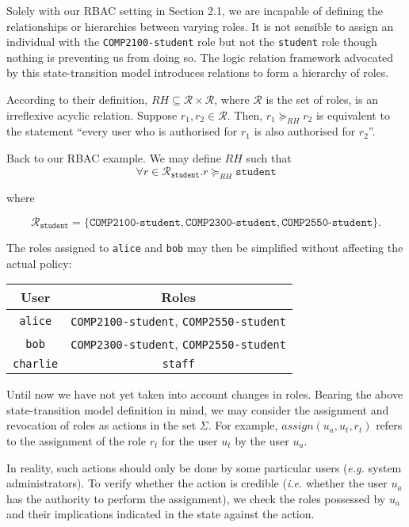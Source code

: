 \documentclass{article}
\begin{document}
Solely with our RBAC setting in Section 2.1, we are incapable of defining the relationships or hierarchies between varying roles. It is not sensible to assign an individual with the \texttt{COMP2100-student} role but not the \texttt{student} role though nothing is preventing us from doing so. The logic relation framework advocated by this state-transition model introduces relations to form a hierarchy of roles.

According to their definition, $RH \subseteq \mathcal{R} \times \mathcal{R}$, where $\mathcal{R}$ is the set of roles, is an irreflexive acyclic relation.\cite{formal-verification} Suppose $r_{1}, r_{2} \in \mathcal{R}$. Then, $r_{1} \succeq_{RH} r_{2}$ is equivalent to the statement ``every user who is authorised for $r_{1}$ is also authorised for $r_{2}$''.

Back to our RBAC example. We may define $RH$ such that
$$\forall r \in \mathcal{R}_{\texttt{student}} . r \succeq_{RH} \texttt{student}$$
\begin{center}
    where
\end{center}
$$\mathcal{R}_{\texttt{student}} = \{ \texttt{COMP2100-student}, \texttt{COMP2300-student}, \texttt{COMP2550-student} \}.$$

The roles assigned to \texttt{alice} and \texttt{bob} may then be simplified without affecting the actual policy:
\begin{center}
\begin{tabular}{c|c}
    User & Roles\\
    \hline
    \texttt{alice} & \texttt{COMP2100-student}, \texttt{COMP2550-student}\\
    \texttt{bob} & \texttt{COMP2300-student}, \texttt{COMP2550-student}\\
    \texttt{charlie} & \texttt{staff}
\end{tabular}
\end{center}

Until now we have not yet taken into account changes in roles. Bearing the above state-transition model definition in mind, we may consider the assignment and revocation of roles as actions in the set $\Sigma$. For example, $\textit{assign}(u_{a}, u_{t}, r_{t})$ refers to the assignment of the role $r_{t}$ for the user $u_{t}$ by the user $u_{a}$.

In reality, such actions should only be done by some particular users (\textit{e.g.} system administrators). To verify whether the action is credible (\textit{i.e.} whether the user $u_{a}$ has the authority to perform the assignment), we check the roles possessed by $u_{a}$ and their implications indicated in the state against the action.
\end{document}
